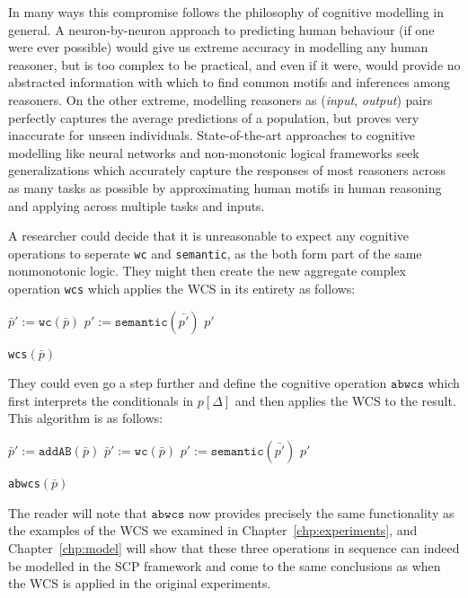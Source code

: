 In many ways this compromise follows the philosophy of cognitive modelling in general. A neuron-by-neuron approach to predicting human behaviour (if one were ever possible) would give us extreme accuracy in modelling any human reasoner, but is too complex to be practical, and even if it were, would provide no abstracted information with which to find common motifs and inferences among reasoners. On the other extreme, modelling reasoners as (\textit{input}, \textit{output}) pairs perfectly captures the average predictions of a population, but proves very inaccurate for unseen individuals. State-of-the-art approaches to cognitive modelling like neural networks and non-monotonic logical frameworks seek generalizations which accurately capture the responses of most reasoners across as many tasks as possible by approximating human motifs in human reasoning and applying across multiple tasks and inputs.

A researcher could decide that it is unreasonable to expect any cognitive operations to seperate \texttt{wc} and \texttt{semantic}, as the both form part of the same nonmonotonic logic. They might then create the new aggregate complex operation \texttt{wcs} which applies the WCS in its entirety as follows:

\begin{algorithm}[H] \label{cogOp:wcs}
\SetAlgoLined
{}
{
$\bar{p}':=\texttt{wc}(\bar{p})$\;
$p':=\texttt{semantic}(\bar{p'})$\;
\Return $p'$
}

\caption{\texttt{wcs}$(\bar{p})$}
\end{algorithm}

They could even go a step further and define the cognitive operation $\texttt{abwcs}$ which first interprets the conditionals in $p[\Delta]$ and then applies the WCS to the result. This algorithm is as follows:

\begin{algorithm}[H] \label{cogOp:abwcs}
\SetAlgoLined
{}
{
$\bar{p}':=\texttt{addAB}(\bar{p})$\;
$\bar{p}':=\texttt{wc}(\bar{p})$\;
$p':=\texttt{semantic}(\bar{p'})$\;
\Return $p'$
}

\caption{\texttt{abwcs}$(\bar{p})$}
\end{algorithm}

The reader will note that $\texttt{abwcs}$ now provides precisely the same functionality as the examples of the WCS we examined in Chapter~\ref{chp:experiments}, and Chapter~\ref{chp:model} will show that these three operations in sequence can indeed be modelled in the SCP framework and come to the same conclusions as when the WCS is applied in the original experiments.

